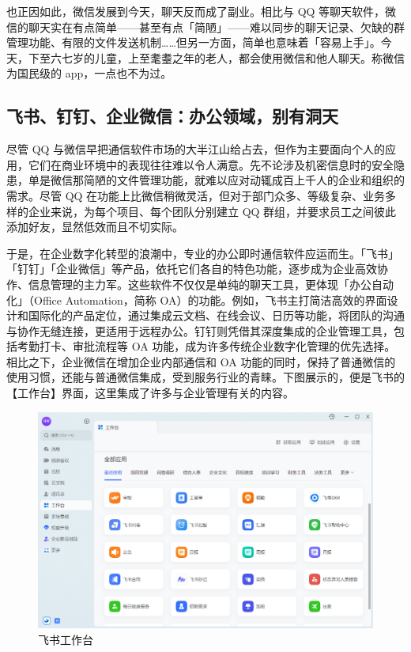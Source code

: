 也正因如此，微信发展到今天，聊天反而成了副业。相比与 QQ 等聊天软件，微信的聊天实在有点简单——甚至有点「简陋」——难以同步的聊天记录、欠缺的群管理功能、有限的文件发送机制……但另一方面，简单也意味着「容易上手」。今天，下至六七岁的儿童，上至耄耋之年的老人，都会使用微信和他人聊天。称微信为国民级的 app，一点也不为过。

\subsection{飞书、钉钉、企业微信：办公领域，别有洞天}

尽管 QQ 与微信早把通信软件市场的大半江山给占去，但作为主要面向个人的应用，它们在商业环境中的表现往往难以令人满意。先不论涉及机密信息时的安全隐患，单是微信那简陋的文件管理功能，就难以应对动辄成百上千人的企业和组织的需求。尽管 QQ 在功能上比微信稍微灵活，但对于部门众多、等级复杂、业务多样的企业来说，为每个项目、每个团队分别建立 QQ 群组，并要求员工之间彼此添加好友，显然低效而且不切实际。

于是，在企业数字化转型的浪潮中，专业的办公即时通信软件应运而生。「飞书」「钉钉」「企业微信」等产品，依托它们各自的特色功能，逐步成为企业高效协作、信息管理的主力军。这些软件不仅仅是单纯的聊天工具，更体现「办公自动化」（Office Automation，简称 OA）的功能。例如，飞书主打简洁高效的界面设计和国际化的产品定位，通过集成云文档、在线会议、日历等功能，将团队的沟通与协作无缝连接，更适用于远程办公。钉钉则凭借其深度集成的企业管理工具，包括考勤打卡、审批流程等 OA 功能，成为许多传统企业数字化管理的优先选择。相比之下，企业微信在增加企业内部通信和 OA 功能的同时，保持了普通微信的使用习惯，还能与普通微信集成，受到服务行业的青睐。下图展示的，便是飞书的【工作台】界面，这里集成了许多与企业管理有关的内容。

\begin{figure}[htb!]
  \centering
  \includegraphics[width=.7\textwidth]{assets/software/Feishu_2.png}
  \caption{飞书工作台}
  \label{fig:Feishu_1}
\end{figure}

